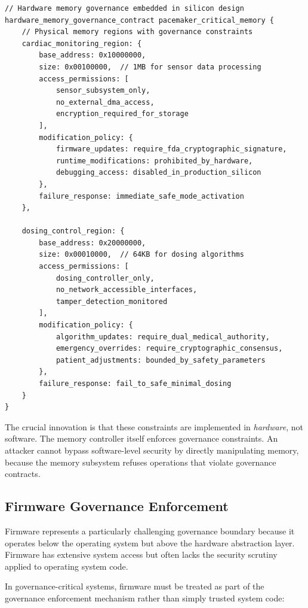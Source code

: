 \begin{lstlisting}[language=rift, caption=Hardware-Level Memory Governance]
// Hardware memory governance embedded in silicon design
hardware_memory_governance_contract pacemaker_critical_memory {
    // Physical memory regions with governance constraints
    cardiac_monitoring_region: {
        base_address: 0x10000000,
        size: 0x00100000,  // 1MB for sensor data processing
        access_permissions: [
            sensor_subsystem_only,
            no_external_dma_access,
            encryption_required_for_storage
        ],
        modification_policy: {
            firmware_updates: require_fda_cryptographic_signature,
            runtime_modifications: prohibited_by_hardware,
            debugging_access: disabled_in_production_silicon
        },
        failure_response: immediate_safe_mode_activation
    },
    
    dosing_control_region: {
        base_address: 0x20000000,
        size: 0x00010000,  // 64KB for dosing algorithms
        access_permissions: [
            dosing_controller_only,
            no_network_accessible_interfaces,
            tamper_detection_monitored
        ],
        modification_policy: {
            algorithm_updates: require_dual_medical_authority,
            emergency_overrides: require_cryptographic_consensus,
            patient_adjustments: bounded_by_safety_parameters
        },
        failure_response: fail_to_safe_minimal_dosing
    }
}
\end{lstlisting}

The crucial innovation is that these constraints are implemented in \textit{hardware}, not software. The memory controller itself enforces governance constraints. An attacker cannot bypass software-level security by directly manipulating memory, because the memory subsystem refuses operations that violate governance contracts.

\subsection{Firmware Governance Enforcement}

Firmware represents a particularly challenging governance boundary because it operates below the operating system but above the hardware abstraction layer. Firmware has extensive system access but often lacks the security scrutiny applied to operating system code.

In governance-critical systems, firmware must be treated as part of the governance enforcement mechanism rather than simply trusted system code:

